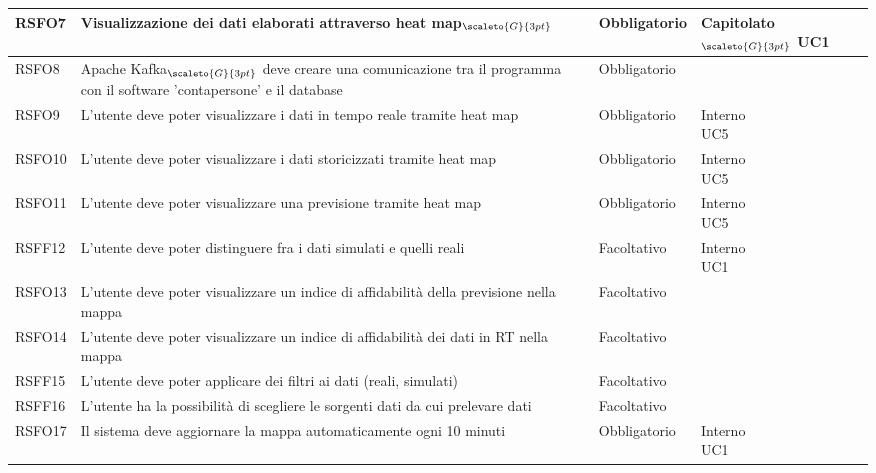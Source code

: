 {\begin{center}
\begin{longtable}{|p{3cm}|p{4cm}|p{4cm}|p{4cm}|}
			\hline
			\centering RSFO7 & Visualizzazione dei dati elaborati attraverso heat map$_{\scaleto{G}{3pt}}$ &\centering  Obbligatorio & \makecell[tc]{Capitolato$_{\scaleto{G}{3pt}}$ \\ UC1}  \\
			\hline
			\centering RSFO8 & Apache Kafka$_{\scaleto{G}{3pt}}$ deve creare una comunicazione tra il programma con il software 'contapersone' e il database  &\centering  Obbligatorio &  \makecell[tc]{Capitolato$_{\scaleto{G}{3pt}}$ } 	\\
			\hline
			\centering RSFO9 & L'utente deve poter visualizzare i dati in tempo reale tramite heat map  &\centering  Obbligatorio &  \makecell[tc]{Interno \\ UC5} 	\\
			\hline
			\centering RSFO10 & L'utente deve poter visualizzare i dati storicizzati tramite heat map  &\centering  Obbligatorio &  \makecell[tc]{Interno \\ UC5} 	\\
			\hline
			\centering RSFO11 & L'utente deve poter visualizzare una previsione tramite heat map  &\centering  Obbligatorio &  \makecell[tc]{Interno \\ UC5} 	\\
			\hline
			\centering RSFF12 & L'utente deve poter distinguere fra i dati simulati e quelli reali  &\centering  Facoltativo &  \makecell[tc]{Interno \\ UC1} 	\\
			\hline
			\centering RSFO13 & L'utente deve poter visualizzare un indice di affidabilità della previsione nella mappa  &\centering  Facoltativo &  \makecell[tc]{Interno } 	\\ 
			\hline
			\centering RSFO14 & L'utente deve poter visualizzare un indice di affidabilità dei dati in RT nella mappa  &\centering  Facoltativo &  \makecell[tc]{Interno } 	\\
			\hline
			\centering RSFF15 & L'utente deve poter applicare dei filtri ai dati (reali, simulati)  &\centering  Facoltativo &  \makecell[tc]{Interno } 	\\
			\hline
			\centering RSFF16 & L'utente ha la possibilità di scegliere le sorgenti dati da cui prelevare dati  &\centering  Facoltativo &  \makecell[tc]{Interno } 	\\
			\hline
			\centering RSFO17 & Il sistema deve aggiornare la mappa automaticamente ogni 10 minuti &\centering Obbligatorio & \makecell[tc]{Interno \\ UC1} \\

\end{longtable}
\end{center}}
